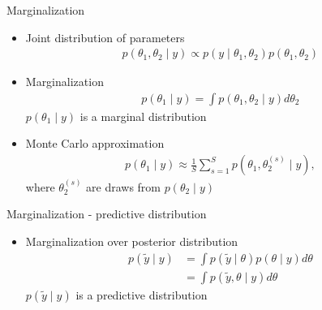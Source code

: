 \documentclass[10pt,handout]{beamer}
\begin{document}
\begin{frame}

  {Marginalization}

  \begin{itemize}
  \item Joint distribution of parameters
    \begin{align*}
      p(\theta_1,\theta_2 \mid y) \propto p(y \mid \theta_1,\theta_2)p(\theta_1,\theta_2)
    \end{align*}
  \item Marginalization
      \begin{align*}
        p(\theta_1 \mid y) = \int p(\theta_1,\theta_2 \mid y) d\theta_2
      \end{align*}
      $p(\theta_1 \mid y)$ is a marginal distribution
       \vspace{0.5\baselineskip}
    \item<2-> Monte Carlo approximation
          \begin{align*}
      p(\theta_1 \mid y) \approx  \frac{1}{S}\sum_{s=1}^{S} p(\theta_1,\theta_2^{(s)}\mid y),
    \end{align*}
    where $\theta_2^{(s)}$ are draws from $p(\theta_2 \mid y)$
  \end{itemize}

\end{frame}

\begin{frame}

  {Marginalization - predictive distribution}

  \begin{itemize}
  \item Marginalization over posterior distribution
      \begin{align*}
        p(\tilde{y} \mid y) & = \int p(\tilde{y} \mid \theta)p(\theta \mid y) d\theta\\
         & = \int p(\tilde{y}, \theta \mid y) d\theta
      \end{align*}
      $p(\tilde{y} \mid y)$ is a predictive distribution
  \end{itemize}

\end{frame}
\end{document}
